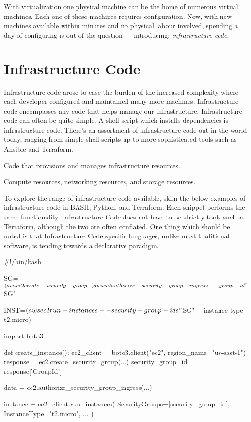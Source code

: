 With virtualization one physical machine can be the home of numerous virtual machines.
Each one of these machines requires configuration.
Now, with new machines available within minutes and no physical labour involved,
spending a day of configuring is out of the question
--- introducing: \textsl{infrastructure code}.

\section{Infrastructure Code}

Infrastructure code arose to ease the burden of the increased complexity where each developer configured and maintained many more machines.
Infrastructure code encompasses any code that helps manage our infrastructure.
Infrastructure code can often be quite simple.
A shell script which installs dependencies is infrastructure code.
There's an assortment of infrastructure code out in the world today, ranging from simple shell scripts up to more sophisticated tools such as Ansible and Terraform.

\begin{definition}
Code that provisions and manages infrastructure resources.
\end{definition}

\begin{definition}
Compute resources, networking resources, and storage resources.
\end{definition}

To explore the range of infrastructure code available, skim the below examples of infrastructure code in BASH, Python, and Terraform.
Each snippet performs the same functionality.
Infrastructure Code does not have to be strictly tools such as Terraform,
although the two are often conflated.
One thing which should be noted is that Infrastructure Code specific languages,
unlike most traditional software,
is tending towards a declarative paradigm.

\begin{code}[language=bash]{}
#!/bin/bash

SG=$(aws ec2 create-security-group ...)

aws ec2 authorize-security-group-ingress --group-id "$SG"

INST=$(aws ec2 run-instances --security-group-ids "$SG" \
            --instance-type t2.micro)
\end{code}

\begin{code}[language=python]{}
import boto3

def create_instance():
    ec2_client = boto3.client("ec2", region_name="us-east-1")
    response = ec2.create_security_group(...)
    security_group_id = response['GroupId']

    data = ec2.authorize_security_group_ingress(...)

    instance = ec2_client.run_instances(
        SecurityGroups=[security_group_id],
        InstanceType="t2.micro",
        ...
    )
\end{code}

